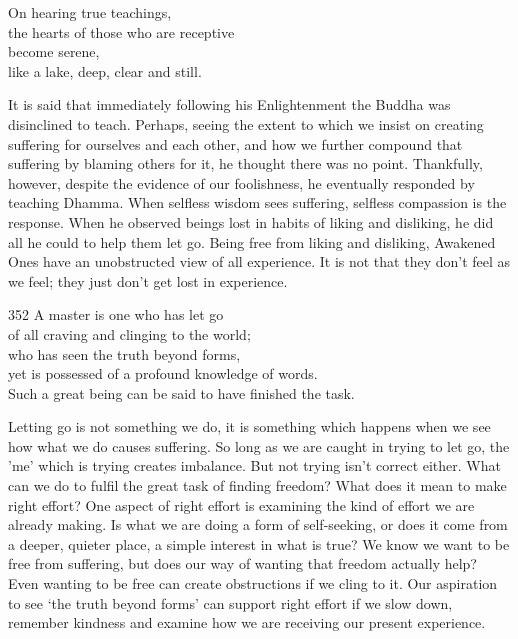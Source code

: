 
\begin{dhpVerse}{82}
\label{dhp-82}
On hearing true teachings,\\
the hearts of those who are receptive\\
become serene,\\
like a lake, deep, clear and still. 
\end{dhpVerse}

\begin{dhpRefl}
  It is said that immediately following his Enlightenment the Buddha was
  disinclined to teach. Perhaps, seeing the extent to which we insist on
  creating suffering for ourselves and each other, and how we further compound
  that suffering by blaming others for it, he thought there was no point.
  Thankfully, however, despite the evidence of our foolishness, he eventually
  responded by teaching Dhamma. When selfless wisdom sees suffering, selfless
  compassion is the response. When he observed beings lost in habits of liking
  and disliking, he did all he could to help them let go. Being free from liking
  and disliking, Awakened Ones have an unobstructed view of all experience. It
  is not that they don’t feel as we feel; they just don’t get lost in
  experience.
\end{dhpRefl}


\begin{dhpVerse}{352}
\label{dhp-352}
A master is one who has let go\\
of all craving and clinging to the world;\\
who has seen the truth beyond forms,\\
yet is possessed of a profound knowledge of words.\\
Such a great being can be said to have finished the task.
\end{dhpVerse}

\begin{dhpRefl}
  Letting go is not something we do, it is something which happens when we see
  how what we do causes suffering. So long as we are caught in trying to let go,
  the 'me' which is trying creates imbalance. But not trying isn’t correct
  either. What can we do to fulfil the great task of finding freedom? What does
  it mean to make right effort? One aspect of right effort is examining the kind
  of effort we are already making. Is what we are doing a form of self-seeking,
  or does it come from a deeper, quieter place, a simple interest in what is
  true? We know we want to be free from suffering, but does our way of wanting
  that freedom actually help? Even wanting to be free can create obstructions if
  we cling to it. Our aspiration to see ‘the truth beyond forms’ can support
  right effort if we slow down, remember kindness and examine how we are
  receiving our present experience.
\end{dhpRefl}

